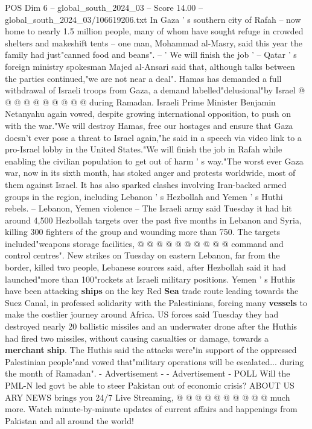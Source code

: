 \begin{textsample}{POS Dim 6 – global\_south\_2024\_03 – Score 14.00 – global\_south\_2024\_03/106619206.txt}
In Gaza ' s southern city of Rafah -- now home to nearly 1.5 million people, many of whom have sought refuge in crowded shelters and makeshift tents -- one man, Mohammad al-Masry, said this year the family had just"canned food and beans". -- ' We will finish the job ' -- Qatar ' s foreign ministry spokesman Majed al-Ansari said that, although talks between the parties continued,"we are not near a deal".
Hamas has demanded a full withdrawal of Israeli troops from Gaza, a demand labelled"delusional"by Israel @ @ @ @ @ @ @ @ @ @ during Ramadan.
Israeli Prime Minister Benjamin Netanyahu again vowed, despite growing international opposition, to push on with the war."We will destroy Hamas, free our hostages and ensure that Gaza doesn't ever pose a threat to Israel again,"he said in a speech via video link to a pro-Israel lobby in the United States."We will finish the job in Rafah while enabling the civilian population to get out of harm ' s way."The worst ever Gaza war, now in its sixth month, has stoked anger and protests worldwide, most of them against Israel.
It has also sparked clashes involving Iran-backed armed groups in the region, including Lebanon ' s Hezbollah and Yemen ' s Huthi rebels. -- Lebanon, Yemen violence -- The Israeli army said Tuesday it had hit around 4,500 Hezbollah targets over the past five months in Lebanon and Syria, killing 300 fighters of the group and wounding more than 750.
The targets included"weapons storage facilities, @ @ @ @ @ @ @ @ @ @ command and control centres".
New strikes on Tuesday on eastern Lebanon, far from the border, killed two people, Lebanese sources said, after Hezbollah said it had launched"more than 100"rockets at Israeli military positions.
Yemen ' s Huthis have been attacking \textbf{ships} on the key Red \textbf{Sea} trade route leading towards the Suez Canal, in professed solidarity with the Palestinians, forcing many \textbf{vessels} to make the costlier journey around Africa.
US forces said Tuesday they had destroyed nearly 20 ballistic missiles and an underwater drone after the Huthis had fired two missiles, without causing casualties or damage, towards a \textbf{merchant} \textbf{ship}.
The Huthis said the attacks were"in support of the oppressed Palestinian people"and vowed that"military operations will be escalated... during the month of Ramadan". - Advertisement - - Advertisement - POLL Will the PML-N led govt be able to steer Pakistan out of economic crisis?
ABOUT US ARY NEWS brings you 24/7 Live Streaming, @ @ @ @ @ @ @ @ @ @ much more.
Watch minute-by-minute updates of current affairs and happenings from Pakistan and all around the world!

\end{textsample}
